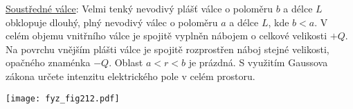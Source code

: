 \begin{example}\label{fyz:fey_exam001}
  \href{http://librarian/stable.php?id=380}{Soustředné válce}: Velmi tenký nevodivý plášť 
  válce o poloměru \(b\) a délce \(L\) obklopuje dlouhý, plný nevodivý válec o poloměru \(a\) 
  a délce \(L\), kde \(b < a\). V celém objemu vnitřního válce je spojitě vyplněn
  nábojem o celkové velikosti \(+Q\). Na povrchu vnějším plášti válce je spojitě rozprostřen 
  náboj stejné velikosti, opačného znaménka \(−Q\). Oblast \(a < r < b\) je prázdná. S 
  využitím Gaussova zákona určete intenzitu elektrického pole v celém prostoru.
        
  {\centering
   \captionsetup{type=figure}
   \texttt{[image: fyz\_fig212.pdf]}
  \par}
  

\end{example}
